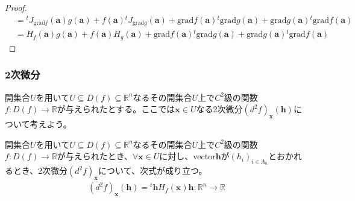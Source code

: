 \documentclass[dvipdfmx]{jsarticle}
\begin{document}
\begin{proof}
\begin{align*}
&={}^{t}J_{\mathrm{grad}f}\left( \mathbf{a} \right)g\left( \mathbf{a} \right) + f\left( \mathbf{a} \right){}^{t}J_{\mathrm{grad}g}\left( \mathbf{a} \right) + \mathrm{grad}f\left( \mathbf{a} \right){}^{t}\mathrm{grad}g\left( \mathbf{a} \right) + \mathrm{grad}g\left( \mathbf{a} \right){}^{t}\mathrm{grad}f\left( \mathbf{a} \right)\\
&= H_{f}\left( \mathbf{a} \right)g\left( \mathbf{a} \right) + f\left( \mathbf{a} \right)H_{g}\left( \mathbf{a} \right) + \mathrm{grad}f\left( \mathbf{a} \right){}^{t}\mathrm{grad}g\left( \mathbf{a} \right) + \mathrm{grad}g\left( \mathbf{a} \right){}^{t}\mathrm{grad}f\left( \mathbf{a} \right)
\end{align*}
\end{proof}
\subsubsection{2次微分}%
開集合$U$を用いて$U \subseteq D(f) \subseteq \mathbb{R}^{n}$なるその開集合$U$上で$C^{2}$級の関数$f:D(f) \rightarrow \mathbb{R}$が与えられたとする。ここでは$\mathbf{x} \in U$なる2次微分$\left( d^{2}f \right)_{\mathbf{x}}\left( \mathbf{h} \right)$について考えよう。
\begin{thm}\label{4.2.7.9}
開集合$U$を用いて$U \subseteq D(f) \subseteq \mathbb{R}^{n}$なるその開集合$U$上で$C^{2}$級の関数$f:D(f) \rightarrow \mathbb{R}$が与えられたとき、$\forall\mathbf{x} \in U$に対し、vector$\mathbf{h}$が$\left( h_{i} \right)_{i \in \varLambda_{n}}$とおかれるとき、2次微分$\left( d^{2}f \right)_{\mathbf{x}}$について、次式が成り立つ。
\begin{align*}
\left( d^{2}f \right)_{\mathbf{x}}\left( \mathbf{h} \right) ={}^{t}\mathbf{h}H_{f}\left( \mathbf{x} \right)\mathbf{h}:\mathbb{R}^{n} \rightarrow \mathbb{R}
\end{align*}
\end{thm}
\end{document}

